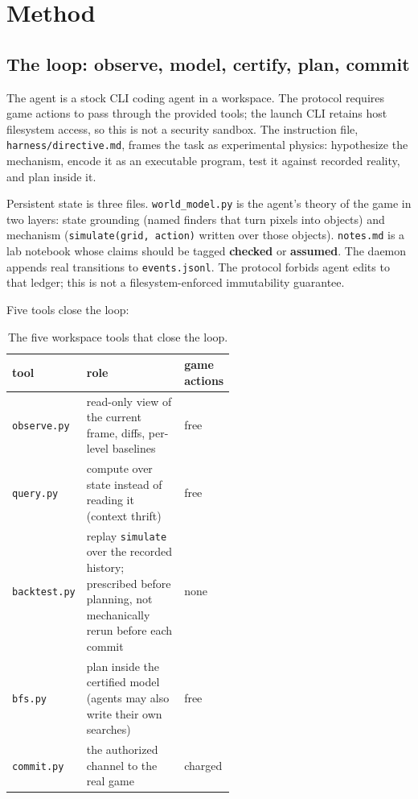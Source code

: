 \documentclass[11pt]{article}
\begin{document}
\section{Method}\label{sec:method}

\subsection{The loop: observe, model, certify, plan, commit}\label{sec:loop}

The agent is a stock CLI coding agent in a workspace. The protocol requires game actions to pass through the provided tools; the launch CLI retains host filesystem access, so this is not a security sandbox. The instruction file, \texttt{harness/directive.md}, frames the task as experimental physics: hypothesize the mechanism, encode it as an executable program, test it against recorded reality, and plan inside it.

Persistent state is three files. \texttt{world\_model.py} is the agent's theory of the game in two layers: state grounding (named finders that turn pixels into objects) and mechanism (\texttt{simulate(grid, action)} written over those objects). \texttt{notes.md} is a lab notebook whose claims should be tagged \textbf{checked} or \textbf{assumed}. The daemon appends real transitions to \texttt{events.jsonl}. The protocol forbids agent edits to that ledger; this is not a filesystem-enforced immutability guarantee.

Five tools close the loop:

\begin{table}[ht]
  \centering
  \caption{The five workspace tools that close the loop.}
  \label{tab:tools}
  \begin{tabular}{@{}l p{0.55\linewidth} l@{}}
    \toprule
    tool & role & game actions \\
    \midrule
    \texttt{observe.py} & read-only view of the current frame, diffs, per-level baselines & free \\
    \texttt{query.py} & compute over state instead of reading it (context thrift) & free \\
    \texttt{backtest.py} & replay \texttt{simulate} over the recorded history; prescribed before planning, not mechanically rerun before each commit & none \\
    \texttt{bfs.py} & plan inside the certified model (agents may also write their own searches) & free \\
    \texttt{commit.py} & the authorized channel to the real game & charged \\
    \bottomrule
  \end{tabular}
\end{table}
\end{document}
